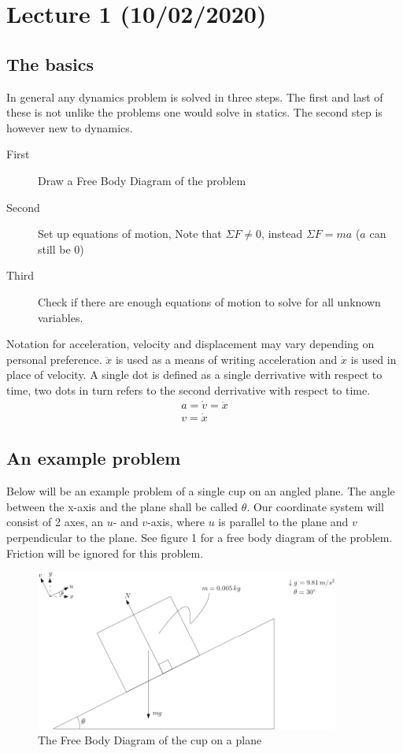 \documentclass[11pt, a4paper]{article}
\begin{document}
\section{Lecture 1 (10/02/2020)}
\subsection{The basics}
In general any dynamics problem is solved in three steps. The first and last of these is not unlike the problems
one would solve in statics. The second step is however new to dynamics.
\begin{description}
    \item[First]  Draw a Free Body Diagram of the problem
    \item[Second] Set up equations of motion, Note that $\Sigma F \neq 0$, instead $\Sigma F = ma$ ($a$ can still be 0)
    \item[Third]  Check if there are enough equations of motion to solve for all unknown variables.
\end{description}
Notation for acceleration, velocity and displacement may vary depending
on personal preference. $\ddot{x}$ is used as a means of writing acceleration
and $\dot{x}$ is used in place of velocity. A single dot is defined as a single derrivative
with respect to time, two dots in turn refers to the second derrivative with respect to time.
\begin{gather*}
    a = \dot{v} = \ddot{x} \\
    v = \dot{x}
\end{gather*}


\subsection{An example problem}
Below will be an example problem of a single cup on an angled plane. The angle between the x-axis
and the plane shall be called $\theta$. Our coordinate system will consist of 2 axes, an $u$- and $v$-axis, 
where $u$ is parallel to the plane and $v$ perpendicular to the plane. See figure 1 for a free body diagram of
the problem. Friction will be ignored for this problem.

\begin{figure}[h]
    \centerline{\includegraphics[width=10cm]{images/Crate_No_Friction.png}}
    \caption{The Free Body Diagram of the cup on a plane}
\end{figure}
\end{document}
